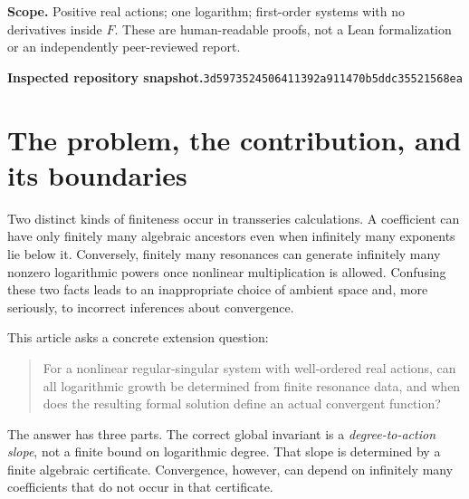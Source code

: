 \documentclass[11pt,a4paper]{article}
\numberwithin{equation}{section}
\theoremstyle{definition}
\theoremstyle{remark}
\newcommand{\snap}{\texttt{3d5973524506411392a911470b5ddc35521568ea}}
\begin{document}
\begin{titlepage}
\begin{abstract}
An explicit nonlinear Riccati family with actions \(2-1/n\) separates
finite resonance control from convergence particularly sharply. Its
logarithmic slope depends on the single polynomial \(b+ca^2\), whereas
absolute convergence is equivalent to \(\sum n|t_n|<\infty\). Thus
coefficients \(t_n=\varepsilon n^{-p}\) have the exact threshold \(p>2\),
even in the presence of nonlinear feedback. Complete conventional proofs,
finite symbolic verification, and twelve further research directions are
provided. Classical Dulac majorants and the repository's linear
resonance results are acknowledged; historical priority is not asserted.
\end{abstract}
\vfill
\noindent\small\textbf{Scope.} Positive real actions; one logarithm;
first-order systems with no derivatives inside \(F\). These are human-readable
proofs, not a Lean formalization or an independently peer-reviewed report.\par
\vspace{2mm}
\noindent\small\textbf{Inspected repository snapshot.}\quad\snap
\end{titlepage}
\hypersetup{pageanchor=true}
\tableofcontents
\newpage

\section{The problem, the contribution, and its boundaries}
\label{sec:introduction}

Two distinct kinds of finiteness occur in transseries calculations. A
coefficient can have only finitely many algebraic ancestors even when
infinitely many exponents lie below it. Conversely, finitely many
resonances can generate infinitely many nonzero logarithmic powers once
nonlinear multiplication is allowed. Confusing these two facts leads to
an inappropriate choice of ambient space and, more seriously, to
incorrect inferences about convergence.

This article asks a concrete extension question:
\begin{quote}
For a nonlinear regular-singular system with well-ordered real actions,
can all logarithmic growth be determined from finite resonance data,
and when does the resulting formal solution define an actual convergent
function?
\end{quote}
The answer has three parts. The correct global invariant is a
\emph{degree-to-action slope}, not a finite bound on logarithmic degree.
That slope is determined by a finite algebraic certificate. Convergence,
however, can depend on infinitely many coefficients that do not occur in
that certificate.
\end{document}
